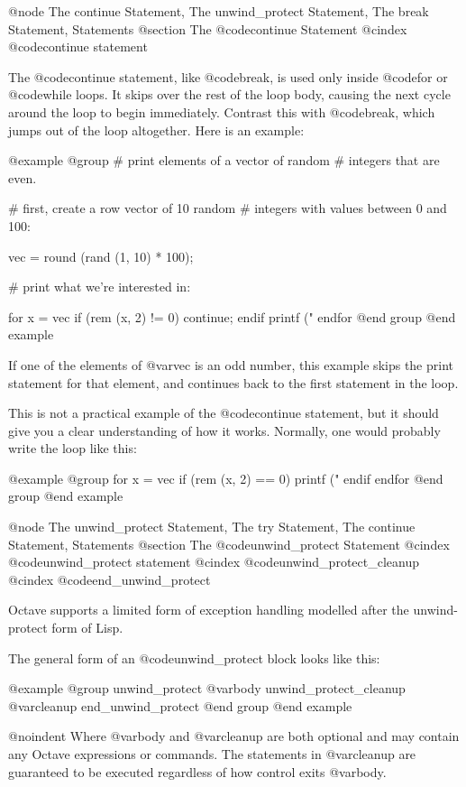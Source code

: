 @node The continue Statement, The unwind_protect Statement, The break Statement, Statements
@section The @code{continue} Statement
@cindex @code{continue} statement

The @code{continue} statement, like @code{break}, is used only inside
@code{for} or @code{while} loops.  It skips over the rest of the loop
body, causing the next cycle around the loop to begin immediately.
Contrast this with @code{break}, which jumps out of the loop altogether.
Here is an example:

@example
@group
# print elements of a vector of random
# integers that are even.

# first, create a row vector of 10 random
# integers with values between 0 and 100:

vec = round (rand (1, 10) * 100);

# print what we're interested in:

for x = vec
  if (rem (x, 2) != 0)
    continue;
  endif
  printf ("%
endfor
@end group
@end example

If one of the elements of @var{vec} is an odd number, this example skips
the print statement for that element, and continues back to the first
statement in the loop.

This is not a practical example of the @code{continue} statement, but it
should give you a clear understanding of how it works.  Normally, one
would probably write the loop like this:

@example
@group
for x = vec
  if (rem (x, 2) == 0)
    printf ("%
  endif
endfor
@end group
@end example

@node The unwind_protect Statement, The try Statement, The continue Statement, Statements
@section The @code{unwind_protect} Statement
@cindex @code{unwind_protect} statement
@cindex @code{unwind_protect_cleanup}
@cindex @code{end_unwind_protect}

Octave supports a limited form of exception handling modelled after the
unwind-protect form of Lisp.  

The general form of an @code{unwind_protect} block looks like this:

@example
@group
unwind_protect
  @var{body}
unwind_protect_cleanup
  @var{cleanup}
end_unwind_protect
@end group
@end example

@noindent
Where @var{body} and @var{cleanup} are both optional and may contain any
Octave expressions or commands.  The statements in @var{cleanup} are 
guaranteed to be executed regardless of how control exits @var{body}.

